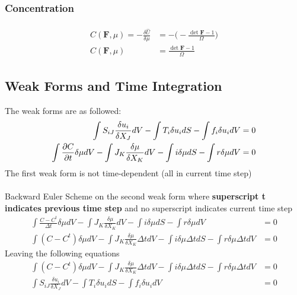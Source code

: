 \documentclass[12pt,3p]{article}
\numberwithin{equation}{section}
\begin{document}
\subsubsection{Concentration}
\begin{align}\label{Concentration}
\begin{split}
C (\mathbf{F}, \mu) = - \frac{\delta \hat{U}}{\delta \mu} &= - \bigg( - \frac{\det \mathbf{F} - 1}{\Omega} \bigg) \\
						C (\mathbf{F}, \mu) &= \frac{\det \mathbf{F} - 1}{\Omega}
\end{split}
\end{align}

\subsection{Weak Forms and Time Integration}
The weak forms are as followed: 
\begin{align}\label{WeakForm}
\begin{split}
\int S_{iJ} \frac{\delta u_i}{\delta X_J} dV - \int T_i \delta u_i dS - \int f_i \delta u_i dV &= 0 \\
\int \pdv{C}{t} \delta \mu dV - \int J_K \frac{\delta \mu}{\delta X_K} dV - \int i \delta \mu dS - \int r \delta \mu dV &= 0 
\end{split}
\end{align}
The first weak form is not time-dependent (all in current time step) \\ \\
Backward Euler Scheme on the second weak form where \textbf{superscript t indicates previous time step} and no superscript indicates current time step
\begin{align*}
\int \frac{C - C^t}{\Delta t} \delta \mu dV - \int J_K \frac{\delta \mu}{\delta X_K} dV - \int i \delta \mu dS - \int r \delta \mu dV &= 0 \\
\int (C - C^t) \delta \mu dV - \int J_K \frac{\delta \mu}{\delta X_K} \Delta t dV - \int i \delta \mu \Delta t dS - \int r \delta \mu \Delta t dV &= 0 
\end{align*}
Leaving the following equations
\begin{align*}
\int (C - C^t) \delta \mu dV - \int J_K \frac{\delta \mu}{\delta X_K} \Delta t dV - \int i \delta \mu \Delta t dS - \int r \delta \mu \Delta t dV &= 0 \\
\int S_{iJ} \frac{\delta u_i}{\delta X_J} dV - \int T_i \delta u_i dS - \int f_i \delta u_i dV &= 0
\end{align*}
\end{document}

